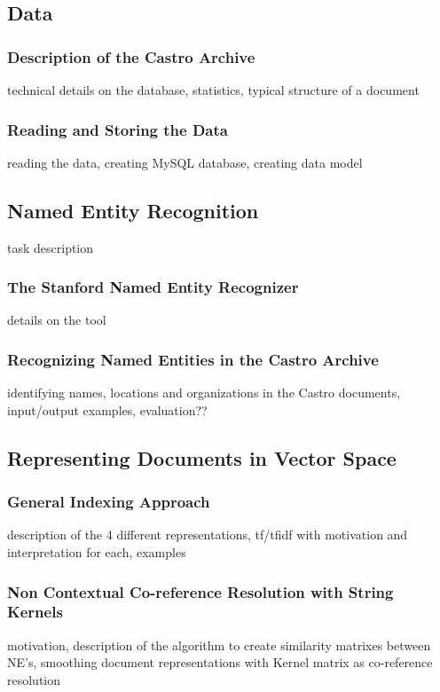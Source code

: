
\subsection {Data}
	\subsubsection{Description of the Castro Archive}
	\note technical details on the database, statistics, typical structure of a document
	\subsubsection{Reading and Storing the Data}
	\note reading the data, creating MySQL database, creating data model
	
\subsection {Named Entity Recognition}
\note task description
	\subsubsection{The Stanford Named Entity Recognizer}
	\note details on the tool
	\subsubsection{Recognizing Named Entities in the Castro Archive} 
	\note identifying names, locations and organizations in the Castro documents, input/output examples, evaluation??
		
\subsection {Representing Documents in Vector Space}
	\subsubsection{General Indexing Approach}
	\note description of the 4 different representations, tf/tfidf with motivation and interpretation for each, examples
	\subsubsection {Non Contextual Co-reference Resolution with String Kernels}
	\note motivation, description of the algorithm to create similarity matrixes between NE's, smoothing document
        representations with Kernel matrix as co-reference resolution
		
